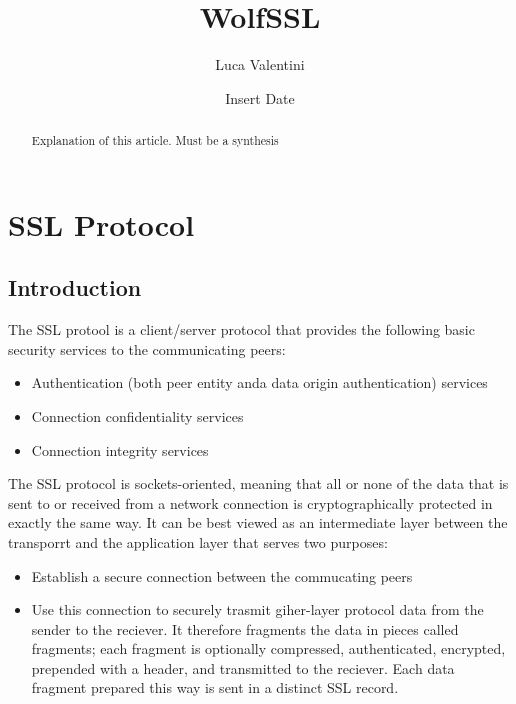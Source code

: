 \documentclass[a4paper,12pt]{report}
\title{WolfSSL}
\author{Luca Valentini}
\date{Insert Date}
\begin{document}
\maketitle
\tableofcontents



\newpage
\begin{abstract}
 Explanation of this article. Must be a synthesis
\end{abstract}


\chapter{SSL Protocol}

\section{Introduction}
The SSL protool is a client/server protocol that provides the following basic security services to the communicating peers:
\begin{itemize}
	\item Authentication (both peer entity anda data origin authentication) services
	\item Connection confidentiality services
	\item Connection integrity services
\end{itemize}

The SSL protocol is sockets-oriented, meaning that all or none of the data that is sent to or received from a network connection is cryptographically protected in exactly the same way. It can be best viewed as an intermediate layer between the transporrt and the application layer that serves two purposes:
\begin{itemize}
	\item Establish a secure connection between the commucating peers
	\item Use this connection to securely trasmit giher-layer protocol data from the sender to the reciever. It therefore fragments the data in pieces called fragments; each fragment is optionally compressed, authenticated, encrypted, prepended with a header, and transmitted to the reciever. Each data fragment prepared this way is sent in a distinct SSL record.
\end{itemize}
\end{document}
